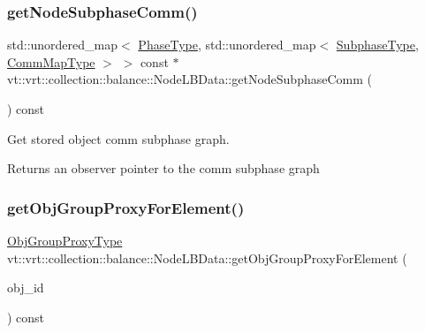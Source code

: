 \subsubsection{\texorpdfstring{get\+Node\+Subphase\+Comm()}{getNodeSubphaseComm()}}
{\footnotesize\ttfamily std\+::unordered\+\_\+map$<$ \hyperlink{namespacevt_a46ce6733d5cdbd735d561b7b4029f6d7}{Phase\+Type}, std\+::unordered\+\_\+map$<$ \hyperlink{namespacevt_ae78cbfdf1e57470e33eedb074f2beeba}{Subphase\+Type}, \hyperlink{namespacevt_1_1vrt_1_1collection_1_1balance_a01ee1fb0ae2da1d2ab7fdca3be9ae351}{Comm\+Map\+Type} $>$ $>$ const  $\ast$ vt\+::vrt\+::collection\+::balance\+::\+Node\+L\+B\+Data\+::get\+Node\+Subphase\+Comm (\begin{DoxyParamCaption}{ }\end{DoxyParamCaption}) const}



Get stored object comm subphase graph. 

\begin{DoxyReturn}{Returns}
an observer pointer to the comm subphase graph 
\end{DoxyReturn}
\mbox{\label{structvt_1_1vrt_1_1collection_1_1balance_1_1_node_l_b_data_a1f410baa1f6a5088a814fdcda87ff6d4}} 
\subsubsection{\texorpdfstring{get\+Obj\+Group\+Proxy\+For\+Element()}{getObjGroupProxyForElement()}}
{\footnotesize\ttfamily \hyperlink{namespacevt_ad7cae989df485fccca57f0792a880a8e}{Obj\+Group\+Proxy\+Type} vt\+::vrt\+::collection\+::balance\+::\+Node\+L\+B\+Data\+::get\+Obj\+Group\+Proxy\+For\+Element (\begin{DoxyParamCaption}\item[{\hyperlink{namespacevt_1_1vrt_1_1collection_1_1balance_a9f5b53fafb270212279a4757d2c4cd28}{Element\+I\+D\+Struct}}]{obj\+\_\+id }\end{DoxyParamCaption}) const}



